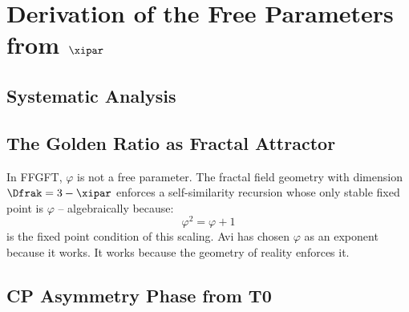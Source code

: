 \section{\texorpdfstring{Derivation of the Free Parameters from $\xipar$}{Derivation of the Free Parameters from}}

\subsection{Systematic Analysis}

\begin{center}
{\footnotesize
{}
} %
\end{center}

\subsection{The Golden Ratio as Fractal Attractor}

In FFGFT, $\varphi$ is not a free parameter. The fractal field geometry with dimension $\Dfrak = 3 - \xipar$ enforces a self-similarity recursion whose only stable fixed point is $\varphi$ -- algebraically because:
\begin{equation}
  \varphi^2 = \varphi + 1
\end{equation}
is the fixed point condition of this scaling. Avi has chosen $\varphi$ as an exponent because it works. It works because the geometry of reality enforces it.

\subsection{CP Asymmetry Phase from T0}

